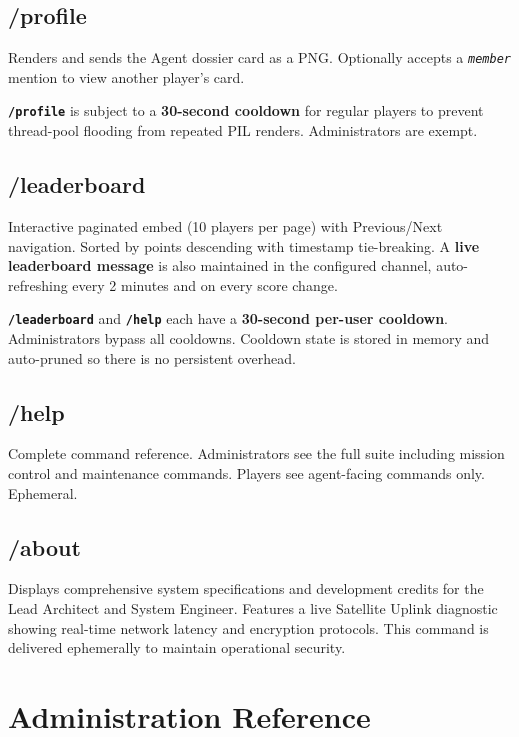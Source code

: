 \documentclass[12pt,a4paper]{report}
\newcommand{\cmd}[1]{\texttt{\color{cybercyan}\textbf{#1}}}
\newcommand{\param}[1]{\texttt{\color{cyberdark}\textit{#1}}}
\newcommand{\note}[1]{
    \begin{tcolorbox}[colback=cyberblue!5, colframe=cyberblue,
        title=\textbf{NOTE}, fonttitle=\sffamily\small]
    #1
    \end{tcolorbox}
}
\begin{document}
\section{/profile}

Renders and sends the Agent dossier card as a PNG. Optionally accepts a \param{member} mention
to view another player's card.

\note{\cmd{/profile} is subject to a \textbf{30-second cooldown} for regular players to prevent
thread-pool flooding from repeated PIL renders. Administrators are exempt.}

\section{/leaderboard}

Interactive paginated embed (10 players per page) with Previous/Next navigation. Sorted by points
descending with timestamp tie-breaking. A \textbf{live leaderboard message} is also maintained
in the configured channel, auto-refreshing every 2 minutes and on every score change.

\note{\cmd{/leaderboard} and \cmd{/help} each have a \textbf{30-second per-user cooldown}.
Administrators bypass all cooldowns. Cooldown state is stored in memory and auto-pruned
so there is no persistent overhead.}

\section{/help}

Complete command reference. Administrators see the full suite including mission control and
maintenance commands. Players see agent-facing commands only. Ephemeral.

\section{/about}

Displays comprehensive system specifications and development credits for the Lead Architect
and System Engineer. Features a live Satellite Uplink diagnostic showing real-time
network latency and encryption protocols. This command is delivered ephemerally to
maintain operational security.

\chapter{Administration Reference}
\end{document}

